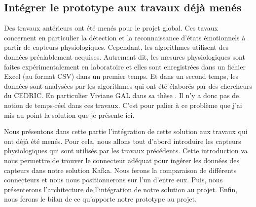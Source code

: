 \documentclass[11pt]{article}
\begin{document}
	\subsection{Intégrer le prototype aux travaux déjà menés}\label{sec:travaux}
		Des travaux antérieurs ont été menés pour le projet global.
		Ces tavaux concernent en particulier la détection et la reconnaissance d'états émotionnels à partir de capteurs physiologiques.
		Cependant, les algorithmes utilisent des données préalablement acquises. 
		Autrement dit, les mesures physiologiques sont faites expérimentalement en laboratoire et elles sont enregistrées dans un fichier Excel (au format CSV) dans un premier temps.
		Et dans un second temps, les données sont analysées par les algorithmes qui ont été élaborés par des chercheurs du CEDRIC.
		En particulier Viviane GAL dans sa thèse \cite{gal_2019}.
		Il n'y a donc pas de notion de temps-réel dans ces travaux.
		C'est pour palier à ce problème que j'ai mis au point la solution que je présente ici.\par
		Nous présentons dans cette partie l'intégration de cette solution aux travaux qui ont déjà été menés.
		Pour cela, nous allons tout d'abord introduire les capteurs physiologiques qui sont utilisés par les travaux précédents.
		Cette introduction va nous permettre de trouver le connecteur adéquat pour ingérer les données des capteurs dans notre solution Kafka.
		Nous ferons la comparaison de différents connecteurs et nous nous positionnerons sur l'un d'entre eux.
		Puis, nous présenterons l'architecture de l'intégration de notre solution au projet.
		Enfin, nous ferons le bilan de ce qu'apporte notre prototype au projet.
\end{document}
